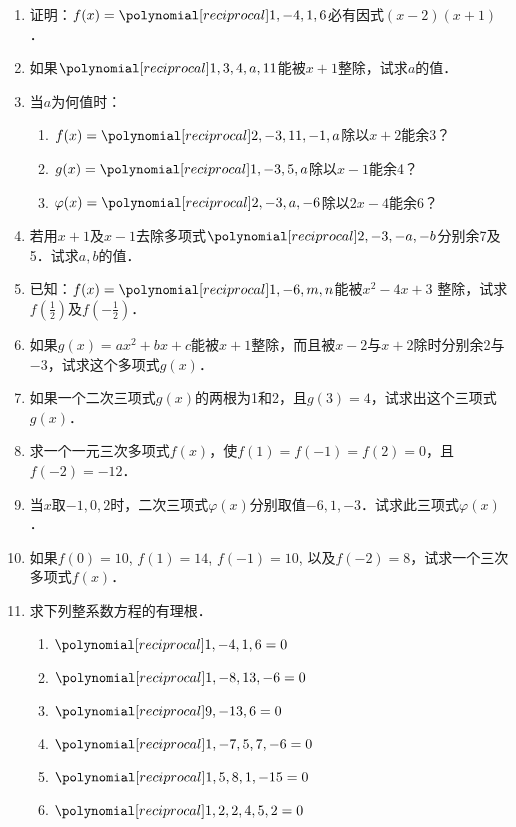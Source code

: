 \begin{enumerate}
\item 证明：$f(x)=\poly{1,-4,1,6}$必有因式$(x-2)(x+1)$．
\item 如果$\poly{1,3,4,a,11}$能被$x+1$整除，试求$a$的值．
\item 当$a$为何值时：
\begin{enumerate}
    \item $f(x)=\poly{2,-3,11,-1,a}$除以$x+2$能余3？
    \item $g(x)=\poly{1,-3,5,a}$除以$x-1$能余4？
    \item $\varphi(x)=\poly{2,-3,a,-6}$除以$2x-4$能余6？
\end{enumerate}

\item 若用$x+1$及$x-1$去除多项式$\poly{2,-3,-a,-b}$分别余7及5．试求$a,b$的值．

\item 已知：$f(x)=\poly{1,-6,m,n}$能被$x^2-4x+3$
整除，试求$f\left(\frac{1}{2}\right)$及$f\left(-\frac{1}{2}\right)$．

\item 如果$g(x)=ax^2+bx+c$能被$x+1$整除，而且被$x-2$与$x+2$除时分别余2与$-3$，试求这个多项式$g(x)$．

\item 如果一个二次三项式$g(x)$的两根为1和2，且$g(3)=4$，试求出这个三项式$g(x)$．

\item 求一个一元三次多项式$f(x)$，使$f(1)=f(-1)=f(2)=0$，且$f(-2)=-12$．
\item 当$x$取$-1, 0, 2$时，二次三项式$\varphi(x)$分别取值$-6,1,-3$．试求此三项式$\varphi(x)$．
\item 如果$f(0)=10$, $f(1)=14$, $f(-1)=10$, 以及$f(-2)=8$，试求一个三次多项式$f(x)$．

\item 求下列整系数方程的有理根．
\begin{multicols}{2}
    \begin{enumerate}
    \item $\poly{1,-4,1,6}=0$
    \item $\poly{1,-8,13,-6}=0$
    \item $\poly{9,-13,6}=0$
    \item $\poly{1,-7,5,7,-6}=0$
    \item $\poly{1,5,8,1,-15}=0$
    \item $\poly{1,2,2,4,5,2}=0$
\end{enumerate}
\end{multicols}


\end{enumerate}
